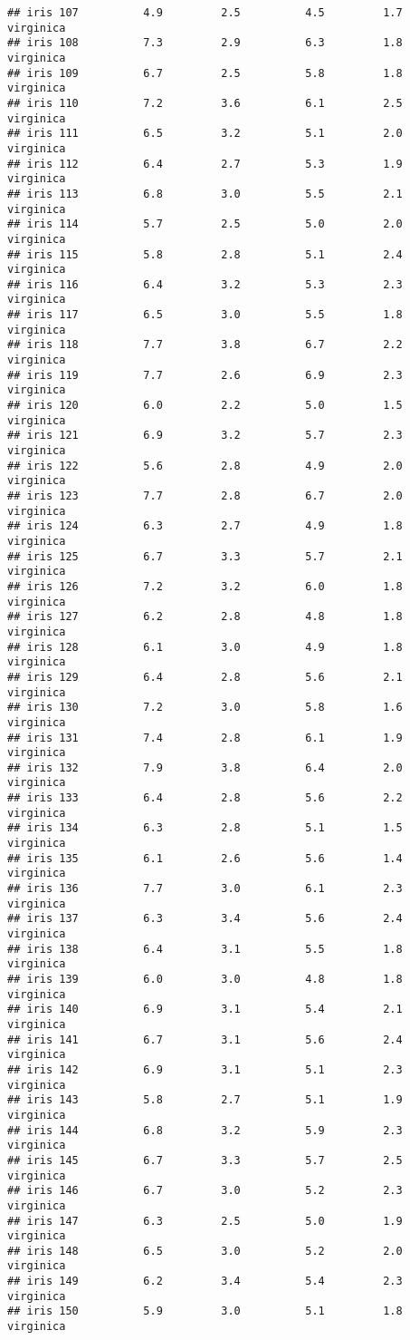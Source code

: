 \documentclass[
]{article}
\begin{document}
\begin{verbatim}
## iris 107          4.9         2.5          4.5         1.7  virginica
## iris 108          7.3         2.9          6.3         1.8  virginica
## iris 109          6.7         2.5          5.8         1.8  virginica
## iris 110          7.2         3.6          6.1         2.5  virginica
## iris 111          6.5         3.2          5.1         2.0  virginica
## iris 112          6.4         2.7          5.3         1.9  virginica
## iris 113          6.8         3.0          5.5         2.1  virginica
## iris 114          5.7         2.5          5.0         2.0  virginica
## iris 115          5.8         2.8          5.1         2.4  virginica
## iris 116          6.4         3.2          5.3         2.3  virginica
## iris 117          6.5         3.0          5.5         1.8  virginica
## iris 118          7.7         3.8          6.7         2.2  virginica
## iris 119          7.7         2.6          6.9         2.3  virginica
## iris 120          6.0         2.2          5.0         1.5  virginica
## iris 121          6.9         3.2          5.7         2.3  virginica
## iris 122          5.6         2.8          4.9         2.0  virginica
## iris 123          7.7         2.8          6.7         2.0  virginica
## iris 124          6.3         2.7          4.9         1.8  virginica
## iris 125          6.7         3.3          5.7         2.1  virginica
## iris 126          7.2         3.2          6.0         1.8  virginica
## iris 127          6.2         2.8          4.8         1.8  virginica
## iris 128          6.1         3.0          4.9         1.8  virginica
## iris 129          6.4         2.8          5.6         2.1  virginica
## iris 130          7.2         3.0          5.8         1.6  virginica
## iris 131          7.4         2.8          6.1         1.9  virginica
## iris 132          7.9         3.8          6.4         2.0  virginica
## iris 133          6.4         2.8          5.6         2.2  virginica
## iris 134          6.3         2.8          5.1         1.5  virginica
## iris 135          6.1         2.6          5.6         1.4  virginica
## iris 136          7.7         3.0          6.1         2.3  virginica
## iris 137          6.3         3.4          5.6         2.4  virginica
## iris 138          6.4         3.1          5.5         1.8  virginica
## iris 139          6.0         3.0          4.8         1.8  virginica
## iris 140          6.9         3.1          5.4         2.1  virginica
## iris 141          6.7         3.1          5.6         2.4  virginica
## iris 142          6.9         3.1          5.1         2.3  virginica
## iris 143          5.8         2.7          5.1         1.9  virginica
## iris 144          6.8         3.2          5.9         2.3  virginica
## iris 145          6.7         3.3          5.7         2.5  virginica
## iris 146          6.7         3.0          5.2         2.3  virginica
## iris 147          6.3         2.5          5.0         1.9  virginica
## iris 148          6.5         3.0          5.2         2.0  virginica
## iris 149          6.2         3.4          5.4         2.3  virginica
## iris 150          5.9         3.0          5.1         1.8  virginica
\end{verbatim}
\end{document}
